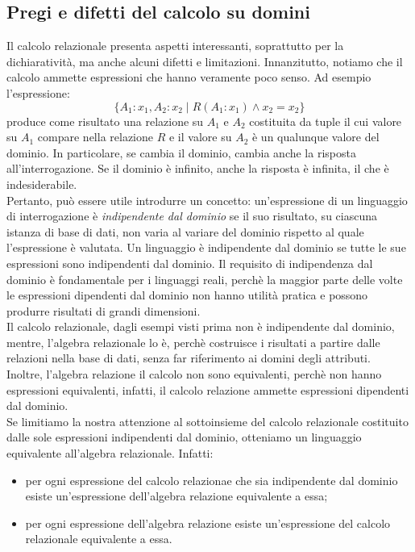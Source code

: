 \documentclass[12pt]{report}
\begin{document}
 	\subsection{Pregi e difetti del calcolo su domini}
 	Il calcolo relazionale presenta aspetti interessanti, soprattutto per la dichiaratività, ma anche alcuni difetti e limitazioni. Innanzitutto, notiamo che il calcolo ammette espressioni che hanno veramente poco senso. Ad esempio l'espressione:
 	\[
 	\{A_1: x_1, A_2: x_2 \mid R(A_1: x_1) \wedge x_2 = x_2\}
 	\]
 	produce come risultato una relazione su $A_1$ e $A_2$ costituita da tuple il cui valore su $A_1$ compare nella relazione $R$ e il valore su $A_2$ è un qualunque valore del dominio. In particolare, se cambia il dominio, cambia anche la risposta all'interrogazione. Se il dominio è infinito, anche la risposta è infinita, il che è indesiderabile. \\
 	Pertanto, può essere utile introdurre un concetto: un'espressione di un linguaggio di interrogazione è \textit{indipendente dal dominio} se il suo risultato, su ciascuna istanza di base di dati, non varia al variare del dominio rispetto al quale l'espressione è valutata.  Un linguaggio è indipendente dal dominio se tutte le sue espressioni sono indipendenti dal dominio. Il requisito di indipendenza dal dominio è fondamentale per i linguaggi reali, perchè la maggior parte delle volte le espressioni dipendenti dal dominio non hanno utilità pratica e possono produrre risultati di grandi dimensioni. \\
 	Il calcolo relazionale, dagli esempi visti prima non è indipendente dal dominio, mentre, l'algebra relazionale lo è, perchè costruisce i risultati a partire dalle relazioni nella base di dati, senza far riferimento ai domini degli attributi. \\
 	Inoltre, l'algebra relazione il calcolo non sono equivalenti, perchè non hanno espressioni equivalenti, infatti, il calcolo relazione ammette espressioni dipendenti dal dominio.  \\
 	Se limitiamo la nostra attenzione al sottoinsieme del calcolo relazionale costituito dalle sole espressioni indipendenti dal dominio, otteniamo un linguaggio equivalente all'algebra relazionale. Infatti:
 	\begin{itemize}
 		\item per ogni espressione del calcolo relazionae che sia indipendente dal dominio esiste un'espressione dell'algebra relazione equivalente a essa;
 		\item per ogni espressione dell'algebra relazione esiste un'espressione del calcolo relazionale equivalente a essa.
 	\end{itemize}
\end{document}
